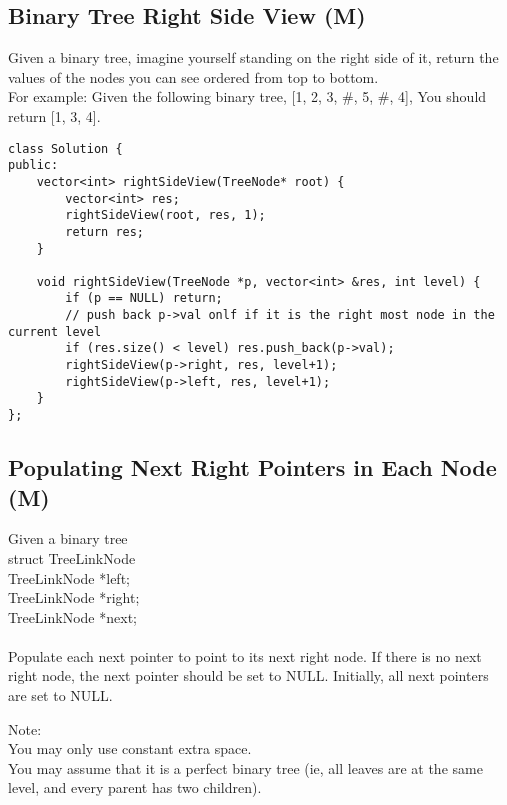 \subsection{Binary Tree Right Side View (M)}
Given a binary tree, imagine yourself standing on the right side of it, return the values of the nodes you can see ordered from top to bottom. \\

For example: Given the following binary tree, [1, 2, 3, \#, 5, \#, 4], You should return [1, 3, 4]. \\

\begin{lstlisting}
class Solution {
public:
    vector<int> rightSideView(TreeNode* root) {
        vector<int> res;
        rightSideView(root, res, 1);
        return res;
    }
    
    void rightSideView(TreeNode *p, vector<int> &res, int level) {
        if (p == NULL) return;
        // push back p->val onlf if it is the right most node in the current level
        if (res.size() < level) res.push_back(p->val);
        rightSideView(p->right, res, level+1);
        rightSideView(p->left, res, level+1);
    }
};
\end{lstlisting}


\subsection{Populating Next Right Pointers in Each Node (M)}
Given a binary tree\\
    struct TreeLinkNode {\\
      TreeLinkNode *left;\\
      TreeLinkNode *right;\\
      TreeLinkNode *next;\\
    }\\

Populate each next pointer to point to its next right node. If there is no next right node, the next pointer should be set to NULL. Initially, all next pointers are set to NULL.\

Note:\\
    You may only use constant extra space.\\
    You may assume that it is a perfect binary tree (ie, all leaves are at the same level, and every parent has two children).\\
    
